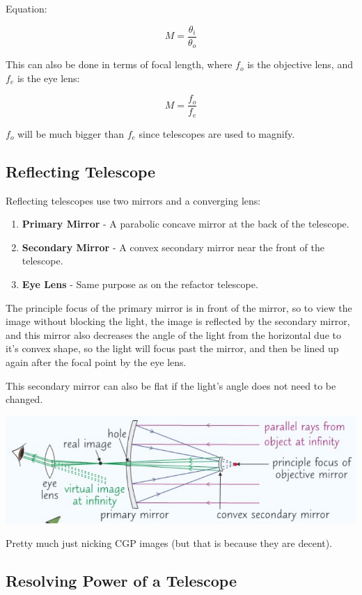 \documentclass[a4paper, 12pt]{article}
\begin{document}
Equation:

$$
M = \frac{\theta_i}{\theta_o}
$$

This can also be done in terms of focal length, where $f_o$ is the objective lens, and $f_e$ is the eye lens:

$$
M = \frac{f_o}{f_e}
$$

$f_o$ will be much bigger than $f_e$ since telescopes are used to magnify.

\subsection{Reflecting Telescope}

Reflecting telescopes use two mirrors and a converging lens:

\begin{enumerate}
	\item \textbf{Primary Mirror} - A parabolic concave mirror at the back of the telescope.
	\item \textbf{Secondary Mirror} - A convex secondary mirror near the front of the telescope.
	\item \textbf{Eye Lens} - Same purpose as on the refactor telescope.
\end{enumerate}

The principle focus of the primary mirror is in front of the mirror, so to view the image without blocking the light, the image is reflected by the secondary mirror, and this mirror also decreases the angle of the light from the horizontal due to it's convex shape, so the light will focus past the mirror, and then be lined up again after the focal point by the eye lens.

This secondary mirror can also be flat if the light's angle does not need to be changed.

\includegraphics[width=\textwidth]{images/reflectingTele.png}

Pretty much just nicking CGP images (but that is because they are decent).

\subsection{Resolving Power of a Telescope}
\end{document}
